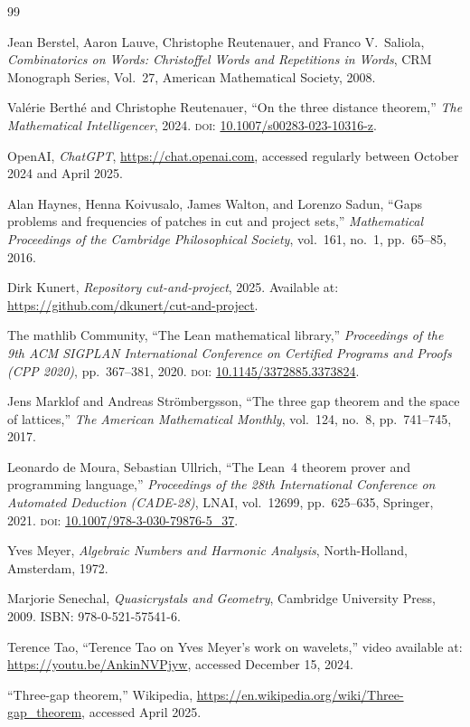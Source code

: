 \documentclass[11pt]{article}
\theoremstyle{plain}
\theoremstyle{definition}
\theoremstyle{remark}
\begin{document}
\begin{thebibliography}{99}

Jean Berstel, Aaron Lauve, Christophe Reutenauer, and Franco V.\ Saliola,
\emph{Combinatorics on Words: Christoffel Words and Repetitions in Words},
CRM Monograph Series, Vol.~27,
American Mathematical Society, 2008.

Val\'{e}rie Berth\'{e} and Christophe Reutenauer,
``On the three distance theorem,''
\emph{The Mathematical Intelligencer}, 2024.
\textsc{doi}: \href{https://doi.org/10.1007/s00283-023-10316-z}%
{10.1007/s00283-023-10316-z}.

OpenAI,
\emph{ChatGPT},
\url{https://chat.openai.com}, accessed regularly between October 2024 and
April 2025.

Alan Haynes, Henna Koivusalo, James Walton, and Lorenzo Sadun,
``Gaps problems and frequencies of patches in cut and project sets,''
\emph{Mathematical Proceedings of the Cambridge Philosophical Society},
vol.~161, no.~1, pp.~65--85, 2016.

Dirk Kunert,
\emph{Repository cut-and-project}, 2025.
Available at: \url{https://github.com/dkunert/cut-and-project}.

The mathlib Community,
``The Lean mathematical library,''
\emph{Proceedings of the 9th ACM SIGPLAN International Conference on
Certified Programs and Proofs (CPP 2020)},
pp.~367--381, 2020.
\textsc{doi}: \href{https://doi.org/10.1145/3372885.3373824}%
{10.1145/3372885.3373824}.

Jens Marklof and Andreas Str\"{o}mbergsson,
``The three gap theorem and the space of lattices,''
\emph{The American Mathematical Monthly}, vol.~124, no.~8, pp.~741--745,
2017.

Leonardo de Moura, Sebastian Ullrich,
``The Lean~4 theorem prover and programming language,''
\emph{Proceedings of the 28th International Conference on Automated
Deduction (CADE-28)},
LNAI, vol.~12699, pp.~625--635, Springer, 2021.
\textsc{doi}: \href{https://doi.org/10.1007/978-3-030-79876-5_37}%
{10.1007/978-3-030-79876-5\_37}.

Yves Meyer,
\emph{Algebraic Numbers and Harmonic Analysis},
North-Holland, Amsterdam, 1972.

Marjorie Senechal,
\emph{Quasicrystals and Geometry},
Cambridge University Press, 2009.
ISBN: 978-0-521-57541-6.

Terence Tao,
``Terence Tao on Yves Meyer's work on wavelets,''
video available at: \url{https://youtu.be/AnkinNVPjyw}, accessed
December 15, 2024.

``Three-gap theorem,''
Wikipedia,
\url{https://en.wikipedia.org/wiki/Three-gap_theorem}, accessed April 2025.

\end{thebibliography}
\end{document}
